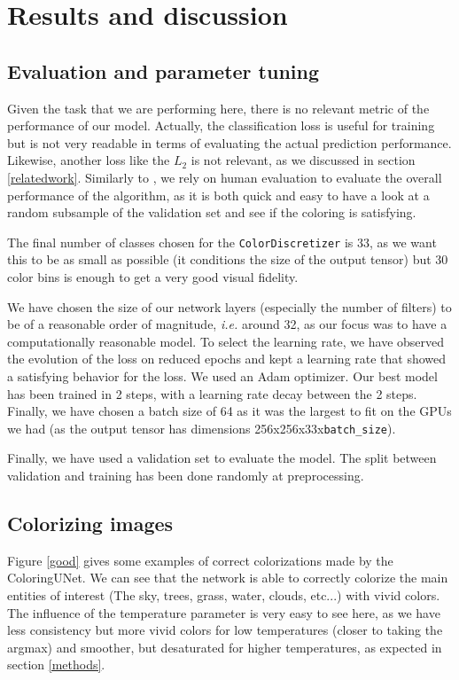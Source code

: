 \documentclass[10pt,twocolumn,letterpaper]{article}
\begin{document}
\section{Results and discussion}
\subsection{Evaluation and parameter tuning}

Given the task that we are performing here, there is no relevant metric of the performance of our model. Actually, the classification loss is useful for training but is not very readable in terms of evaluating the actual prediction performance. Likewise, another loss like the $L_2$ is not relevant, as we discussed in section \ref{relatedwork}. Similarly to \cite{zhang2016colorful}, we rely on human evaluation to evaluate the overall performance of the algorithm, as it is both quick and easy to have a look at a random subsample of the validation set and see if the coloring is satisfying.

The final number of classes chosen for the \texttt{ColorDiscretizer} is 33, as we want this to be as small as possible (it conditions the size of the output tensor) but 30 color bins is enough to get a very good visual fidelity.

We have chosen the size of our network layers (especially the number of filters) to be of a reasonable order of magnitude, \textit{i.e.} around 32, as our focus was to have a computationally reasonable model. To select the learning rate, we have observed the evolution of the loss on reduced epochs and kept a learning rate that showed a satisfying behavior for the loss. We used an Adam optimizer. Our best model has been trained in 2 steps, with a learning rate decay between the 2 steps. Finally, we have chosen a batch size of 64 as it was the largest to fit on the GPUs we had (as the output tensor has dimensions 256x256x33x\texttt{batch\_size}).
 
Finally, we have used a validation set to evaluate the model. The split between validation and training  has been done randomly at preprocessing. 
\subsection{Colorizing images}

Figure \ref{good} gives some examples of correct colorizations made by the ColoringUNet. We can see that the network is able to correctly colorize the main entities of interest (The sky, trees, grass, water, clouds, etc...) with vivid colors. The influence of the temperature parameter is very easy to see here, as we have less consistency but more vivid colors for low temperatures (closer to taking the argmax) and smoother, but desaturated for higher temperatures, as expected in section \ref{methods}.
\end{document}
